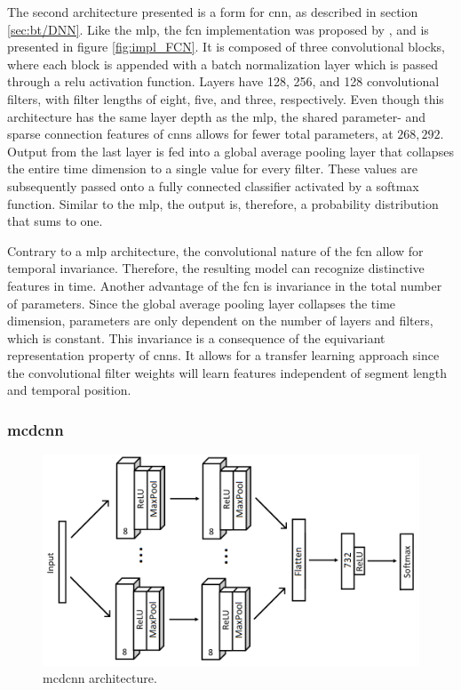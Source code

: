 The second architecture presented is a form for \acrshort{cnn}, as described in section \ref{sec:bt/DNN}. Like the \acrshort{mlp}, the \acrfull{fcn} implementation was proposed by \textcite{wang2016}, and is presented in figure \ref{fig:impl_FCN}. It is composed of three convolutional blocks, where each block is appended with a batch normalization layer which is passed through a \acrshort{relu} activation function. Layers have 128, 256, and 128 convolutional filters, with filter lengths of eight, five, and three, respectively. Even though this architecture has the same layer depth as the \acrshort{mlp}, the shared parameter- and sparse connection features of \acrshort{cnn}s allows for fewer total parameters, at $268,292$. Output from the last layer is fed into a global average pooling layer that collapses the entire time dimension to a single value for every filter. These values are subsequently passed onto a fully connected classifier activated by a softmax function. Similar to the \acrshort{mlp}, the output is, therefore, a probability distribution that sums to one.


Contrary to a \acrshort{mlp} architecture, the convolutional nature of the \acrshort{fcn} allow for temporal invariance. Therefore, the resulting model can recognize distinctive features in time. Another advantage of the \acrshort{fcn} is invariance in the total number of parameters. Since the global average pooling layer collapses the time dimension, parameters are only dependent on the number of layers and filters, which is constant. This invariance is a consequence of the equivariant representation property of \acrshort{cnn}s. It allows for a transfer learning approach since the convolutional filter weights will learn features independent of segment length and temporal position.

\newpage
\subsubsection{\acrlong{mcdcnn}}

\begin{figure}[h]
    \centering
    \includegraphics[width=\textwidth]{figures/impl_MCDCNN.png}
    \caption{\acrlong{mcdcnn} architecture.}
    \label{fig:impl_MCDCNN}
\end{figure}

